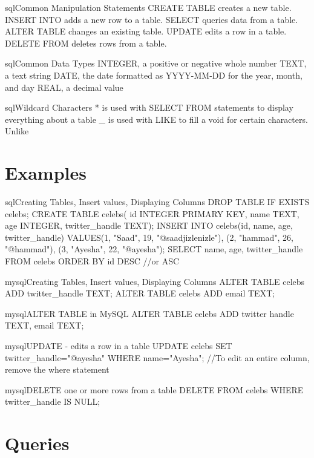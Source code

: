 \begin{codeBlock}{sql}{Common Manipulation Statements}
CREATE TABLE creates a new table.
INSERT INTO adds a new row to a table.
SELECT queries data from a table.
ALTER TABLE changes an existing table.
UPDATE edits a row in a table.
DELETE FROM deletes rows from a table.
\end{codeBlock}

\begin{codeBlock}{sql}{Common Data Types}
INTEGER, a positive or negative whole number
TEXT, a text string
DATE, the date formatted as YYYY-MM-DD for the year, month, and day
REAL, a decimal value 
\end{codeBlock}

\begin{codeBlock}{sql}{Wildcard Characters}
* is used with SELECT FROM statements to display everything about a table
_ is used with LIKE to fill a void for certain characters. Unlike %
\end{codeBlock}

\clearpage
\section{Examples}

\begin{codeBlock}{sql}{{Creating Tables, Insert values, Displaying Columns}}
DROP TABLE IF EXISTS celebs;
CREATE TABLE celebs(
    id INTEGER PRIMARY KEY,
    name TEXT, 
    age INTEGER, 
    twitter_handle TEXT);
INSERT INTO celebs(id, name, age, twitter_handle)
VALUES(1, "Saad", 19, "@saadjizlenizle"),
(2, "hammad", 26, "@hammad"),
(3, "Ayesha", 22, "@ayesha");
SELECT name, age, twitter_handle FROM celebs ORDER BY id DESC //or ASC
\end{codeBlock}

\begin{codeBlock}{mysql}{{Creating Tables, Insert values, Displaying Columns}}
 ALTER TABLE celebs 
 ADD twitter_handle TEXT;
 ALTER TABLE celebs
 ADD email TEXT;
\end{codeBlock}

\begin{codeBlock}{mysql}{{ALTER TABLE in MySQL}}
ALTER TABLE celebs
ADD twitter handle TEXT, email TEXT;
\end{codeBlock}

\begin{codeBlock}{mysql}{{UPDATE - edits a row in a table}}
UPDATE celebs
SET twitter_handle="@ayesha" 
WHERE name="Ayesha";
//To edit an entire column, remove the where statement
\end{codeBlock}

\begin{codeBlock}{mysql}{{DELETE one or more rows from a table}}
DELETE FROM celebs 
WHERE twitter_handle IS NULL;
\end{codeBlock}

\section{Queries}
